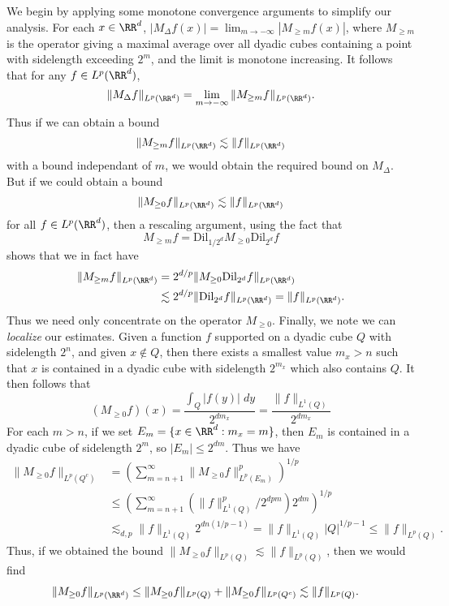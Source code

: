 We begin by applying some monotone convergence arguments to simplify our analysis. For each $x \in \RR^d$, $|M_\Delta f(x)| = \lim_{m \to -\infty} |M_{\geq m} f(x)|$, where $M_{\geq m}$ is the operator giving a maximal average over all dyadic cubes containing a point with sidelength exceeding $2^m$, and the limit is monotone increasing. It follows that for any $f \in L^p(\RR^d)$,
%
\[ \| M_\Delta f \|_{L^p(\RR^d)} = \lim_{m \to -\infty} \| M_{\geq m} f \|_{L^p(\RR^d)}. \]
%
Thus if we can obtain a bound
%
\[ \| M_{\geq m} f \|_{L^p(\RR^d)} \lesssim \| f \|_{L^p(\RR^d)} \]
%
with a bound independant of $m$, we would obtain the required bound on $M_\Delta$. But if we could obtain a bound
%
\[ \| M_{\geq 0} f \|_{L^p(\RR^d)} \lesssim \| f \|_{L^p(\RR^d)} \]
%
for all $f \in L^p(\RR^d)$, then a rescaling argument, using the fact that
%
\[ M_{\geq m} f = \text{Dil}_{1/2^d} M_{\geq 0} \text{Dil}_{2^d} f \]
%
shows that we in fact have
%
\begin{align*}
  \| M_{\geq m} f \|_{L^p(\RR^d)} &= 2^{d/p} \| M_{\geq 0} \text{Dil}_{2^d} f \|_{L^p(\RR^d)}\\
  &\lesssim 2^{d/p} \| \text{Dil}_{2^d} f \|_{L^p(\RR^d)} = \| f \|_{L^p(\RR^d)}.
\end{align*}
%
Thus we need only concentrate on the operator $M_{\geq 0}$. Finally, we note we can \emph{localize} our estimates. Given a function $f$ supported on a dyadic cube $Q$ with sidelength $2^n$, and given $x \not \in Q$, then there exists a smallest value $m_x > n$ such that $x$ is contained in a dyadic cube with sidelength $2^{m_x}$ which also contains $Q$. It then follows that
%
\[ (M_{\geq 0} f)(x) = \frac{\int_Q |f(y)|\; dy}{2^{dm_x}} = \frac{\| f \|_{L^1(Q)}}{2^{dm_x}} \]
%
For each $m > n$, if we set $E_m = \{ x \in \RR^d: m_x = m \}$, then $E_m$ is contained in a dyadic cube of sidelength $2^m$, so $|E_m| \leq 2^{dm}$. Thus we have
%
\begin{align*}
  \| M_{\geq 0} f \|_{L^p(Q^c)} &= \left( \sum_{m = n+1}^\infty \| M_{\geq 0} f \|_{L^p(E_m)}^p \right)^{1/p}\\
  &\leq \left( \sum_{m = n+1}^\infty \left( \| f \|_{L^1(Q)}^p / 2^{dpm} \right) 2^{dm} \right)^{1/p}\\
  &\lesssim_{d,p} \| f \|_{L^1(Q)} 2^{dn(1/p - 1)} = \| f \|_{L^1(Q)} |Q|^{1/p-1} \leq \| f \|_{L^p(Q)}.
\end{align*}
%
Thus, if we obtained the bound $\| M_{\geq 0} f \|_{L^p(Q)} \lesssim \| f \|_{L^p(Q)}$, then we would find
%
\begin{align*}
  \| M_{\geq 0} f \|_{L^p(\RR^d)} &\leq \| M_{\geq 0} f \|_{L^p(Q)} + \| M_{\geq 0} f \|_{L^p(Q^c)} \lesssim \| f \|_{L^p(Q)}.
\end{align*}
